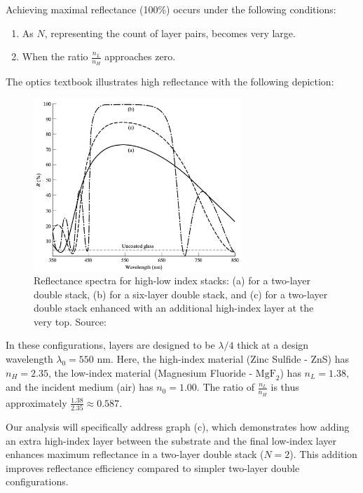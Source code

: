 Achieving maximal reflectance (100\%) occurs under the following conditions:
\begin{enumerate}
    \item As $N$, representing the count of layer pairs, becomes very large.
    \item When the ratio $\frac{n_L}{n_H}$ approaches zero.
\end{enumerate}

The optics textbook illustrates high reflectance with the following depiction:

\begin{figure}[H]
\centering
\includegraphics[width=0.7\textwidth]{Chapters/Figures/Chapter 4 Figures/High-Reflectance Graphs in the Optics Book.png}
\caption{Reflectance spectra for high-low index stacks: (a) for a two-layer double stack, (b) for a six-layer double stack, and (c) for a two-layer double stack enhanced with an additional high-index layer at the very top. Source: \cite{pedrotti_introduction_2007}}
\label{fig:Reflectance spectra from optical literature}
\end{figure}

In these configurations, layers are designed to be $\lambda/4$ thick at a design wavelength $\lambda_0 = 550$ nm. Here, the high-index material (Zinc Sulfide - ZnS) has $n_H = 2.35$, the low-index material (Magnesium Fluoride - $\text{MgF}_2$) has $n_L = 1.38$, and the incident medium (air) has $n_0 = 1.00$. The ratio of $\frac{n_L}{n_H}$ is thus approximately $\frac{1.38}{2.35} \approx 0.587$.

Our analysis will specifically address graph (c), which demonstrates how adding an extra high-index layer between the substrate and the final low-index layer enhances maximum reflectance in a two-layer double stack ($N = 2$). This addition improves reflectance efficiency compared to simpler two-layer double configurations.

